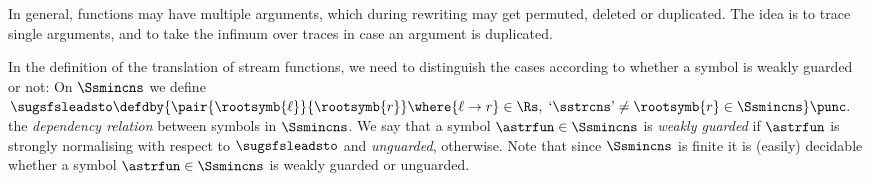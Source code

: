 In general, functions may have multiple arguments,
which during rewriting may get permuted, deleted or duplicated.
The idea is to trace single arguments, and to take the infimum
over traces in case an argument is duplicated.

In the definition of the translation of stream functions,
we need to distinguish the cases according to whether a symbol is weakly guarded or not:
On $\Ssmincns$ we define
\(
  {\sugsfsleadsto}
  \defdby
  \{
    \pair{\rootsymb{\ell}}{\rootsymb{r}}
    \where {\ell\to r} \in \Rs,\; \text{`$\sstrcns$'} \neq \rootsymb{r} \in \Ssmincns
  \}
  \punc.
\)
the \emph{dependency relation} between symbols in $\Ssmincns$.
We say that a symbol $\astrfun \in \Ssmincns$ is \emph{weakly guarded}
if $\astrfun$ is strongly normalising with respect to $\sugsfsleadsto$
and \emph{unguarded}, otherwise.
Note that since $\Ssmincns$ is finite it is (easily) decidable whether
a symbol $\astrfun\in\Ssmincns$ is weakly guarded or unguarded.


